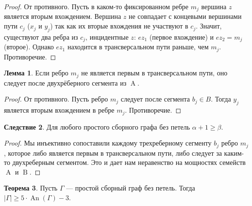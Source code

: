 \documentclass{article}
\theoremstyle{definition}
\newtheorem{theorem}{Теорема}[section]
\newtheorem{lemma}[theorem]{Лемма}
\newtheorem{corollary}[theorem]{Следствие}
\newcommand{\An}{\operatorname{An}}
\newcommand{\A}{\operatorname{A}}
\newcommand{\B}{\operatorname{B}}
\begin{document}
\begin{proof}
От противного. Пусть в каком-то фиксированном ребре $m_j$ вершина $z$ является вторым вхождением. Вершина $z$ не совпадает с концевыми вершинами пути $c_j$ ($x_j$ и $y_j$) так как их вторые вхождения не участвуют в $c_j$. Значит, существуют два ребра из $c_j$, инцидентные $z$: $ez_1$ (первое вхождение) и $ez_2 = m_j$ (второе). Однако $ez_1$ находится в трансверсальном пути раньше, чем $m_j$. Противоречие.
\end{proof}

\begin{lemma}\label{lemma:m-after-A}
    Если ребро $m_j$ не является первым в трансверсальном пути, оно следует после двухрёберного сегмента из $\A$.
\end{lemma}

\begin{proof}
    От противного. Пусть ребро $m_j$ следует после сегмента $b_j \in B$. Тогда $y_j$ является вторым вхождением в ребре $m_j$. Противоречие.
\end{proof}

\begin{corollary}\label{cor:a+1geqb}
    Для любого простого сборного графа без петель $\alpha + 1 \geq \beta$. 
\end{corollary}

\begin{proof}
    Мы инъективно сопоставили каждому трехреберному сегменту $b_j$ ребро $m_j$, которое либо является первым в трансверсальном пути, либо следует за каким-то двухреберным сегментом. Это и дает нам неравенство на мощностях семейств $\A$ и $\B$.
\end{proof}

\begin{theorem}\label{th:5k-3}
    Пусть $\Gamma$ — простой сборный граф без петель. Тогда $|\Gamma| \geq 5 \cdot \An(\Gamma) - 3$.
\end{theorem}
\end{document}
